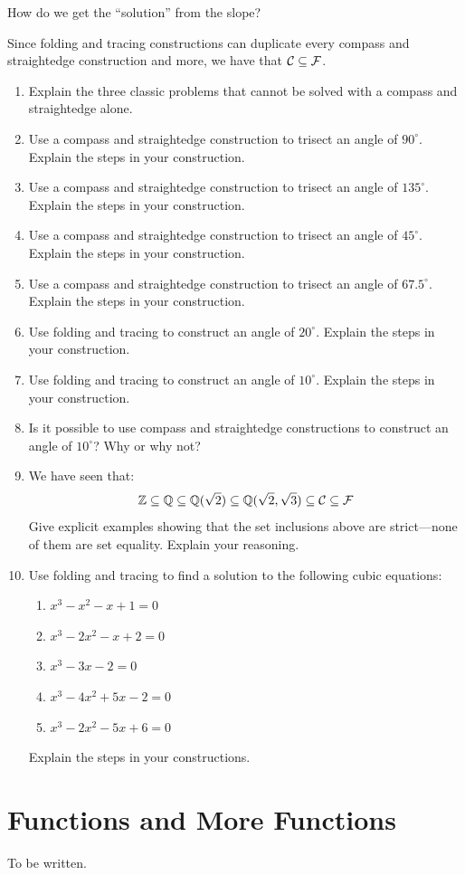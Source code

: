 \begin{question} How do we get the ``solution'' from the slope?
\end{question}
\QM

Since folding and tracing constructions can duplicate every compass and
straightedge construction and more, we have that $\mathcal C \subseteq \mathcal F$.


\begin{problems}
\begin{enumerate}
\item Explain the three classic problems that cannot be solved with a
  compass and straightedge alone.
\item Use a compass and straightedge construction to trisect an angle
  of $90^\circ$. Explain the steps in your construction.
\item Use a compass and straightedge construction to trisect an angle
  of $135^\circ$. Explain the steps in your construction.
\item Use a compass and straightedge construction to trisect an angle
  of $45^\circ$. Explain the steps in your construction.
\item Use a compass and straightedge construction to trisect an angle
  of $67.5^\circ$. Explain the steps in your construction.
\item Use folding and tracing to construct an angle of $20^\circ$. Explain the
  steps in your construction.
\item Use folding and tracing to construct an angle of $10^\circ$. Explain the
  steps in your construction.
\item Is it possible to use compass and straightedge constructions to
  construct an angle of $10^\circ$? Why or why not?
\item We have seen that:
\[
\mathbb Z \subseteq \mathbb Q \subseteq \mathbb Q(\sqrt{2}) \subseteq \mathbb Q(\sqrt{2},\sqrt{3})
\subseteq \mathcal C \subseteq \mathcal F
\]
Give explicit examples showing that the set inclusions above are
strict---none of them are set equality. Explain your reasoning.
\item Use folding and tracing to find a solution to the following cubic equations:
\begin{enumerate}
\item $x^3-x^2 -x+1= 0$ 
\item $x^3-2x^2 -x + 2 = 0$ 
\item $x^3 -3x-2=0$
\item $x^3-4x^2 +5x-2=0$
\item $x^3-2x^2-5x+6=0$
\end{enumerate}
Explain the steps in your constructions.
\end{enumerate}
\end{problems}

\section{Functions and More Functions}

To be written. 



